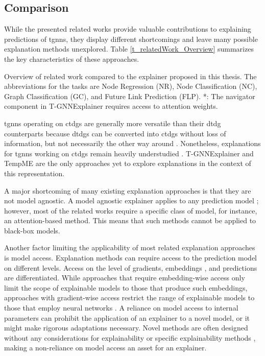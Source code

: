 \subsection{Comparison}
\label{s_relateWork_comparison}

While the presented related works provide valuable contributions to explaining predictions of \glspl{tgnn}, they display different shortcomings and leave many possible explanation methods unexplored. Table \ref{t_relatedWork_Overview} summarizes the key characteristics of these approaches. 

\begin{table}[ht]
    \centering
    \footnotesize
    
    \caption{Overview of related work compared to the explainer proposed in this thesis. The abbreviations for the tasks are Node Regression (NR), Node Classification (NC), Graph Classification (GC), and Future Link Prediction (FLP). *: The navigator component in T-GNNExplainer requires access to attention weights.}
    \label{t_relatedWork_Overview}
\end{table}

\glspl{tgnn} operating on \glspl{ctdg} are generally more versatile than their \gls{dtdg} counterparts because \glspl{dtdg} can be converted into \glspl{ctdg} without loss of information, but not necessarily the other way around \cite{souza_provably_2022}. Nonetheless, explanations for \glspl{tgnn} working on \glspl{ctdg} remain heavily understudied \cite{chen_tempme_2023}. T-GNNExplainer \cite{xia_explaining_2023} and TempME \cite{chen_tempme_2023} are the only approaches yet to explore explanations in the context of this representation.

A major shortcoming of many existing explanation approaches is that they are not model agnostic. A model agnostic explainer applies to any prediction model \cite{prado-romero_survey_2023}; however, most of the related works require a specific class of model, for instance, an attention-based method. This means that such methods cannot be applied to black-box models.

Another factor limiting the applicability of most related explanation approaches is model access. Explanation methods can require access to the prediction model on different levels. Access on the level of gradients, embeddings \cite{verma_counterfactual_2020}, and predictions are differentiated. While approaches that require embedding-wise access only limit the scope of explainable models to those that produce such embeddings, approaches with gradient-wise access restrict the range of explainable models to those that employ neural networks \cite{prado-romero_survey_2023}. A reliance on model access to internal parameters can prohibit the application of an explainer to a novel model, or it might make rigorous adaptations necessary. Novel methods are often designed without any considerations for explainability or specific explainability methods \cite{xia_explaining_2023}, making a non-reliance on model access an asset for an explainer.

